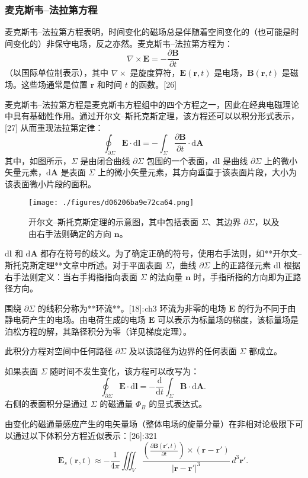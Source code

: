 \subsubsection{麦克斯韦–法拉第方程}
麦克斯韦–法拉第方程表明，时间变化的磁场总是伴随着空间变化的（也可能是时间变化的）非保守电场，反之亦然。麦克斯韦–法拉第方程为：
\[
\nabla \times \mathbf{E} = -\frac{\partial \mathbf{B}}{\partial t}~
\]
（以国际单位制表示），其中 \( \nabla \times \) 是旋度算符，\( \mathbf{E}(\mathbf{r}, t) \) 是电场，\( \mathbf{B}(\mathbf{r}, t) \) 是磁场。这些场通常是位置 \( \mathbf{r} \) 和时间 \( t \) 的函数。[26]

麦克斯韦–法拉第方程是麦克斯韦方程组中的四个方程之一，因此在经典电磁理论中具有基础性作用。通过开尔文–斯托克斯定理，该方程还可以以积分形式表示，[27] 从而重现法拉第定律：
\[
\oint_{\partial \Sigma} \mathbf{E} \cdot \mathrm{d} \mathbf{l} = -\int_{\Sigma} \frac{\partial \mathbf{B}}{\partial t} \cdot \mathrm{d} \mathbf{A}~
\]
其中，如图所示，\( \Sigma \) 是由闭合曲线 \( \partial \Sigma \) 包围的一个表面，\( \mathrm{d}\mathbf{l} \) 是曲线 \( \partial \Sigma \) 上的微小矢量元素，\( \mathrm{d}\mathbf{A} \) 是表面 \( \Sigma \) 上的微小矢量元素，其方向垂直于该表面片段，大小为该表面微小片段的面积。
\begin{figure}[ht]
\centering
\texttt{[image: ./figures/d06206ba9e72ca64.png]}
\caption{开尔文–斯托克斯定理的示意图，其中包括表面 \( \Sigma \)、其边界 \( \partial \Sigma \)，以及由右手法则确定的方向 \( \mathbf{n} \)。} \label{fig_FLDL_8}
\end{figure}
\(\mathrm{d}\mathbf{l}\) 和 \(\mathrm{d}\mathbf{A}\) 都存在符号的歧义。为了确定正确的符号，使用右手法则，如**开尔文–斯托克斯定理**文章中所述。对于平面表面 \(\Sigma\)，曲线 \(\partial \Sigma\) 上的正路径元素 \(\mathrm{d}\mathbf{l}\) 根据右手法则定义：当右手拇指指向表面 \(\Sigma\) 的法向量 \(\mathbf{n}\) 时，手指所指的方向即为正路径方向。

围绕 \(\partial \Sigma\) 的线积分称为**环流**。[18]: ch3 环流为非零的电场 \(\mathbf{E}\) 的行为不同于由静电荷产生的电场。由电荷生成的电场 \(\mathbf{E}\) 可以表示为标量场的梯度，该标量场是泊松方程的解，其路径积分为零（详见梯度定理）。

此积分方程对空间中任何路径 \(\partial \Sigma\) 及以该路径为边界的任何表面 \(\Sigma\) 都成立。

如果表面 \(\Sigma\) 随时间不发生变化，该方程可以改写为：
\[
\oint_{\partial \Sigma} \mathbf{E} \cdot \mathrm{d}\mathbf{l} = -\frac{\mathrm{d}}{\mathrm{d}t} \int_{\Sigma} \mathbf{B} \cdot \mathrm{d}\mathbf{A}.~
\]
右侧的表面积分是通过 \(\Sigma\) 的磁通量 \(\Phi_B\) 的显式表达式。

由变化的磁通量感应产生的电矢量场（整体电场的旋量分量）在非相对论极限下可以通过以下体积分方程近似表示：[26]: 321
\[
\mathbf{E}_s(\mathbf{r}, t) \approx -\frac{1}{4\pi} \iiint_V \frac{\left( \frac{\partial \mathbf{B}(\mathbf{r}', t)}{\partial t} \right) \times (\mathbf{r} - \mathbf{r}')}{|\mathbf{r} - \mathbf{r}'|^3} \, d^3\mathbf{r}'.~
\]

